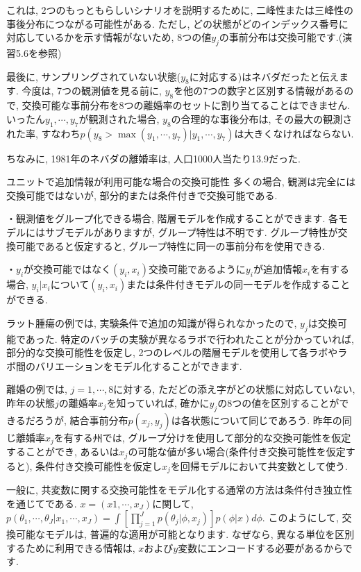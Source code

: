 \documentclass[10pt,dvipdfmx,a4]{beamer}
\begin{document}

\begin{frame}
これは, 2つのもっともらしいシナリオを説明するために, 二峰性または三峰性の事後分布につながる可能性がある.
ただし, どの状態がどのインデックス番号に対応しているかを示す情報がないため, 8つの値$y_j$の事前分布は交換可能です.(演習5.6を参照)

最後に, サンプリングされていない状態($y_8$に対応する)はネバダだったと伝えます.
今度は, 7つの観測値を見る前に, $y_8$を他の7つの数字と区別する情報があるので, 交換可能な事前分布を8つの離婚率のセットに割り当てることはできません.
いったん$y_1,\cdots,y_7$が観測された場合, $y_8$の合理的な事後分布は, その最大の観測された率, すなわち$p(y_8>\max(y_1,\cdots,y_7)| y_1,\cdots,y_7)$は大きくなければならない.

ちなみに, 1981年のネバダの離婚率は, 人口1000人当たり13.9だった.
\end{frame}


\begin{frame}{ユニットで追加情報が利用可能な場合の交換可能性}
多くの場合, 観測は完全には交換可能ではないが, 部分的または条件付きで交換可能である.

・観測値をグループ化できる場合, 階層モデルを作成することができます.
各モデルにはサブモデルがありますが, グループ特性は不明です.
グループ特性が交換可能であると仮定すると, グループ特性に同一の事前分布を使用できる.

・$y_i$が交換可能ではなく$(y_i, x_i)$交換可能であるように$y_i$が追加情報$x_i$を有する場合, $y_i|x_i$について$(y_i, x_i)$または条件付きモデルの同一モデルを作成することができる.

ラット腫瘍の例では, 実験条件で追加の知識が得られなかったので, $y_j$は交換可能であった.
特定のバッチの実験が異なるラボで行われたことが分かっていれば, 部分的な交換可能性を仮定し, 2つのレベルの階層モデルを使用して各ラボやラボ間のバリエーションをモデル化することができます.
\end{frame}


\begin{frame}
離婚の例では, $j=1,\cdots,8$に対する, ただどの添え字がどの状態に対応していない, 昨年の状態$j$の離婚率$x_j$を知っていれば, 確かに$y_j$の8つの値を区別することができるだろうが, 結合事前分布$p(x_j, y_j)$は各状態について同じであろう.
昨年の同じ離婚率$x_j$を有する州では, グループ分けを使用して部分的な交換可能性を仮定することができ, あるいは$x_j$の可能な値が多い場合(条件付き交換可能性を仮定すると), 条件付き交換可能性を仮定し$x_j$を回帰モデルにおいて共変数として使う.

一般に, 共変数に関する交換可能性をモデル化する通常の方法は条件付き独立性を通じてである.
$x=(x1,\cdots,x_J)$に関して, $p(\theta_1,\cdots,\theta_J|x_1,\cdots,x_J)=\int [\prod_{j=1}^J p(\theta_j|\phi,x_j)]p(\phi|x)d\phi$.
このようにして, 交換可能なモデルは, 普遍的な適用が可能となります.
なぜなら, 異なる単位を区別するために利用できる情報は, $x$および$y$変数にエンコードする必要があるからです.
\end{frame}
\end{document}
